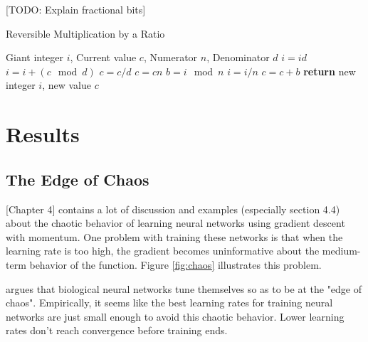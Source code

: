 \documentclass{article}
\begin{document}
[TODO: Explain fractional bits]

\begin{algorithm}
   \caption{Reversible Multiplication by a Ratio}
   \label{alg:reversible-mult}
\begin{algorithmic}[1]
    Giant integer $i$, Current value $c$, Numerator $n$, Denominator $d$
   \State $i = id$ 
   \State $i = i + (c \mod d)$ 
   \State $c = c / d$ 
   \State $c = cn$ 
   \State $b = i \mod n$ 
   \State $i = i / n$ 
   \State $c = c + b$ 
   \State \textbf{return} new integer $i$, new value $c$
\end{algorithmic}
\end{algorithm}
%


\section{Results}

\subsection{The Edge of Chaos}

\cite{pearlmutter1996investigation}[Chapter 4] contains a lot of discussion and examples (especially section 4.4) about the chaotic behavior of learning neural networks using gradient descent with momentum.
One problem with training these networks is that when the learning rate is too high, the gradient becomes uninformative about the medium-term behavior of the function.
Figure \ref{fig:chaos} illustrates this problem.

\cite{pearlmutter2009sleep} argues that biological neural networks tune themselves so as to be at the "edge of chaos".
Empirically, it seems like the best learning rates for training neural networks are just small enough to avoid this chaotic behavior.
Lower learning rates don't reach convergence before training ends.
\end{document}
